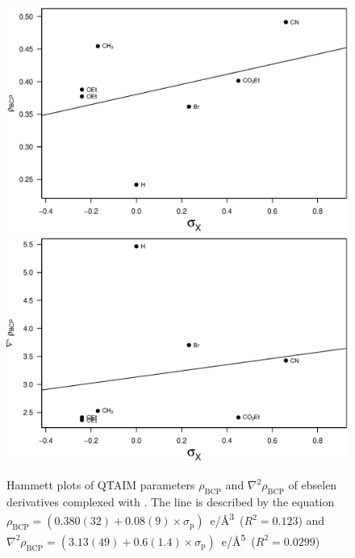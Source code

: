 \begin{refsection}
\begin{figure}
  \centering
  \includegraphics[width=0.45\linewidth]{Figures/hammett-rho-pyrrol.eps}
  \includegraphics[width=0.45\linewidth]{Figures/hammett-lapl-pyrrol.eps}
  \caption[Hammett plots of QTAIM parameters $\rho_\text{BCP}$ and $\nabla^2\rho_{\text{BCP}}$ of ebselen derivatives complexed with .]{Hammett plots of QTAIM parameters $\rho_\text{BCP}$ and $\nabla^2\rho_{\text{BCP}}$ of ebselen derivatives complexed with . The line is described by the equation $\rho_{\text{BCP}} = (0.380(32) + 0.08(9) \times \sigma_\text{p})$~e/\AA\textsuperscript{3}~($R^2=0.123$) and $\nabla^2\rho_{\text{BCP}} = (3.13(49) + 0.6(1.4) \times \sigma_\text{p})$~e/\AA\textsuperscript{5}~($R^2=0.0299$)}\label{fig:hammett-qtaim-pyrrol}
\end{figure}


\end{refsection}
